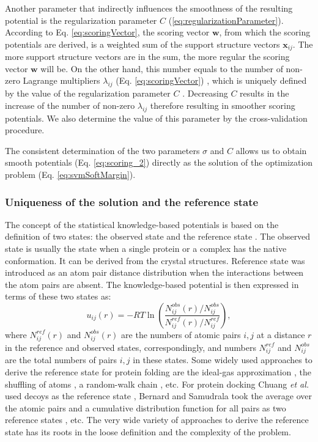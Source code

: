 Another parameter that  indirectly influences the smoothness of the resulting potential is the regularization parameter $C$ (\ref{eq:regularizationParameter}).
According to Eq. \ref{eq:scoringVector}, the scoring vector $\mathbf{w}$, from which the scoring potentials are derived, is a weighted sum of the support structure vectors $\mathbf{x}_{ij}$.
The more support structure vectors are in the sum, the more regular the scoring vector $\mathbf{w}$ will be. 
%
On the other hand, this number equals to the number of non-zero
Lagrange multipliers $\lambda_{ij}$ (Eq. \ref{eq:scoringVector}) ,  which is uniquely defined by the value of the regularization parameter $C$ \cite{pontil1998properties}. 
Decreasing $C$ results in the increase of the number of non-zero $\lambda_{ij}$ therefore resulting in smoother scoring potentials. 
We also determine the value of this parameter by the cross-validation procedure.

The consistent determination of the two parameters $\sigma$ and $C$  allows us to obtain smooth potentials (Eq. \ref{eq:scoring_2}) 
directly as the solution of the optimization problem (Eq. \ref{eq:svmSoftMargin}).

\subsubsection{Uniqueness of the solution and the reference state}

The concept of the statistical knowledge-based potentials is based on the definition of two states: the observed state and the reference state \cite{Tanaka1976, miyazawa1985estimation, sippl1990calculation}.
The observed state is usually the state when a single protein or a complex has the native conformation. It can be derived from the crystal structures.
Reference state was introduced as an atom pair distance distribution when the interactions between the atom pairs are absent. The knowledge-based potential is then expressed in terms of these two states as:
$$u_{ij}(r) = -RT\ln \left( \frac{N^{obs}_{ij}(r)/N^{obs}_{ij}}{N^{ref}_{ij}(r)/N^{ref}_{ij}} \right), $$ where $N^{ref}_{ij}(r)$ and $N^{obs}_{ij}(r)$ are the numbers of atomic pairs $i,j$ at a distance
$r$ in the reference and observed states, correspondingly, and numbers $N^{ref}_{ij}$ and $N^{obs}_{ij}$ are the total numbers of pairs $i,j$ in these states.
%
Some widely used approaches to derive the reference state for protein folding are the ideal-gas approximation \cite{zhou2002distance}, 
the shuffling of atoms \cite{rykunov2007effects}, a random-walk chain \cite{zhang2010novel}, etc. For protein docking 
Chuang \emph{et al.} used decoys as the reference state \cite{chuang2008dars}, Bernard and Samudrala took the average over the atomic pairs and a cumulative distribution function for all pairs 
as two reference states \cite{bernard2009generalized}, etc. The very wide variety of approaches to derive the reference state has its roots in the loose definition and the complexity of the problem. 

